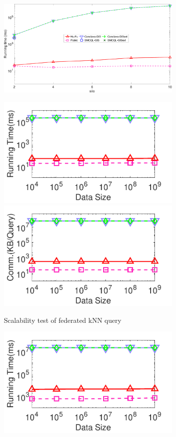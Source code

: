 \begin{figure}[t]
    \centering
    \begin{subfigure}{0.30\textwidth}
        \centering
        \includegraphics[width=\textwidth]{legend.pdf}
    \end{subfigure}
    \begin{subfigure}{0.48\textwidth}
        \centering
        \includegraphics[width=0.48\linewidth]{knn_datasize_time.pdf}
        \includegraphics[width=0.48\linewidth]{knn_datasize_cost.pdf}
        \caption{Scalability test of federated kNN query}
        \label{fig:knn-eff-size-n}
    \end{subfigure}
    \begin{subfigure}{0.48\textwidth}
        \centering
        \includegraphics[width=0.48\linewidth]{knnjoin_datasize_time.pdf}

\end{subfigure}
\end{figure}
